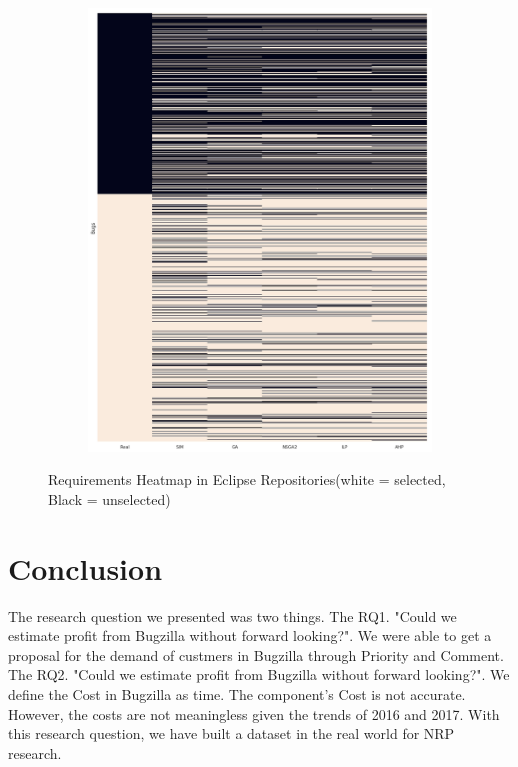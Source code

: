 \begin{figure}[h]
\centering
  \begin{subfigure}[b]{0.95\linewidth}
    \includegraphics[width=\linewidth]{images/heatmap_ec.png}
  \end{subfigure}
  \caption{Requirements Heatmap in Eclipse Repositories(white = selected, Black = unselected)}
  \label{fig:time_cost}
\end{figure}

\section{Conclusion}
The research question we presented was two things.
The RQ1. "Could we estimate profit from Bugzilla without forward looking?". We were able to get a proposal for the demand of custmers in Bugzilla through Priority and Comment. The RQ2. "Could we estimate profit from Bugzilla without forward looking?". We define the Cost in Bugzilla as time. The component's Cost is not accurate. However, the costs are not meaningless given the trends of 2016 and 2017. With this research question, we have built a dataset in the real world for NRP research.

